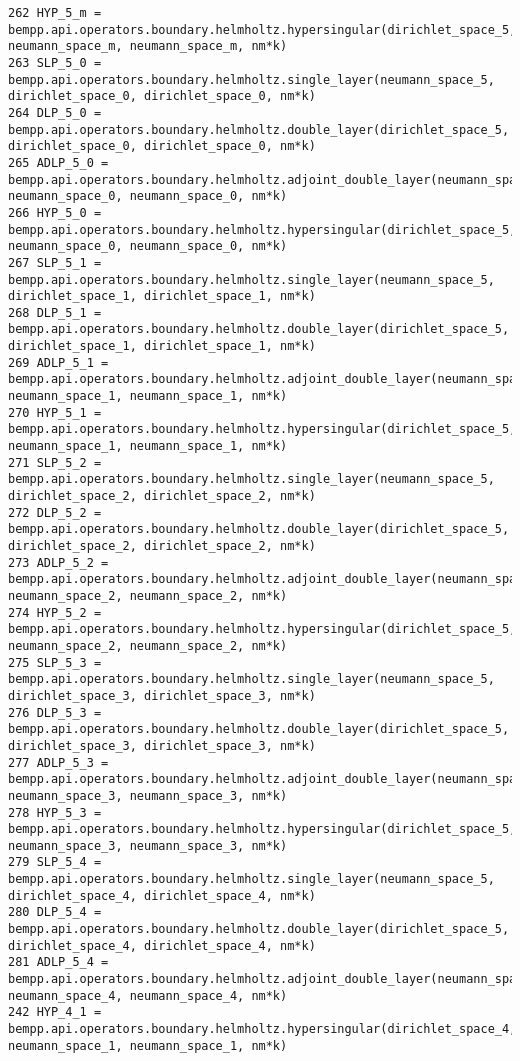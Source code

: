 \documentclass[12pt,letterpaper]{article}
\numberwithin{equation}{section}
\begin{document}
\begin{lstlisting}
262 HYP_5_m = bempp.api.operators.boundary.helmholtz.hypersingular(dirichlet_space_5, neumann_space_m, neumann_space_m, nm*k)
263 SLP_5_0 = bempp.api.operators.boundary.helmholtz.single_layer(neumann_space_5, dirichlet_space_0, dirichlet_space_0, nm*k)
264 DLP_5_0 = bempp.api.operators.boundary.helmholtz.double_layer(dirichlet_space_5, dirichlet_space_0, dirichlet_space_0, nm*k)
265 ADLP_5_0 = bempp.api.operators.boundary.helmholtz.adjoint_double_layer(neumann_space_5, neumann_space_0, neumann_space_0, nm*k)
266 HYP_5_0 = bempp.api.operators.boundary.helmholtz.hypersingular(dirichlet_space_5, neumann_space_0, neumann_space_0, nm*k)
267 SLP_5_1 = bempp.api.operators.boundary.helmholtz.single_layer(neumann_space_5, dirichlet_space_1, dirichlet_space_1, nm*k)
268 DLP_5_1 = bempp.api.operators.boundary.helmholtz.double_layer(dirichlet_space_5, dirichlet_space_1, dirichlet_space_1, nm*k)
269 ADLP_5_1 = bempp.api.operators.boundary.helmholtz.adjoint_double_layer(neumann_space_5, neumann_space_1, neumann_space_1, nm*k)
270 HYP_5_1 = bempp.api.operators.boundary.helmholtz.hypersingular(dirichlet_space_5, neumann_space_1, neumann_space_1, nm*k)
271 SLP_5_2 = bempp.api.operators.boundary.helmholtz.single_layer(neumann_space_5, dirichlet_space_2, dirichlet_space_2, nm*k)
272 DLP_5_2 = bempp.api.operators.boundary.helmholtz.double_layer(dirichlet_space_5, dirichlet_space_2, dirichlet_space_2, nm*k)
273 ADLP_5_2 = bempp.api.operators.boundary.helmholtz.adjoint_double_layer(neumann_space_5, neumann_space_2, neumann_space_2, nm*k)
274 HYP_5_2 = bempp.api.operators.boundary.helmholtz.hypersingular(dirichlet_space_5, neumann_space_2, neumann_space_2, nm*k)
275 SLP_5_3 = bempp.api.operators.boundary.helmholtz.single_layer(neumann_space_5, dirichlet_space_3, dirichlet_space_3, nm*k)
276 DLP_5_3 = bempp.api.operators.boundary.helmholtz.double_layer(dirichlet_space_5, dirichlet_space_3, dirichlet_space_3, nm*k)
277 ADLP_5_3 = bempp.api.operators.boundary.helmholtz.adjoint_double_layer(neumann_space_5, neumann_space_3, neumann_space_3, nm*k)
278 HYP_5_3 = bempp.api.operators.boundary.helmholtz.hypersingular(dirichlet_space_5, neumann_space_3, neumann_space_3, nm*k)
279 SLP_5_4 = bempp.api.operators.boundary.helmholtz.single_layer(neumann_space_5, dirichlet_space_4, dirichlet_space_4, nm*k)
280 DLP_5_4 = bempp.api.operators.boundary.helmholtz.double_layer(dirichlet_space_5, dirichlet_space_4, dirichlet_space_4, nm*k)
281 ADLP_5_4 = bempp.api.operators.boundary.helmholtz.adjoint_double_layer(neumann_space_5, neumann_space_4, neumann_space_4, nm*k)
242 HYP_4_1 = bempp.api.operators.boundary.helmholtz.hypersingular(dirichlet_space_4, neumann_space_1, neumann_space_1, nm*k)

\end{lstlisting}
\end{document}
